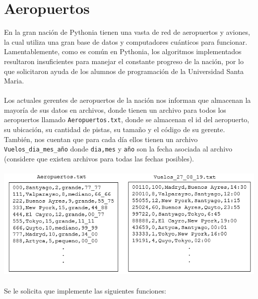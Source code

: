 \section{Aeropuertos}
En la gran nación de Pythonia tienen una vasta de red de aeropuertos y aviones, la cual utiliza una gran base de datos y computadores cuánticos para funcionar. Lamentablemente, como es común en Pythonia, los algoritmos implementados resultaron insuficientes para manejar el constante progreso de la nación, por lo que solicitaron ayuda de los alumnos de programación de la Universidad Santa Maria.\\\\
Los actuales gerentes de aeropuertos de la nación nos informan que almacenan la mayoría de sus datos en archivos, donde tienen un archivo para todos los aeropuertos llamado \texttt{Aeropuertos.txt}, donde se almacenan el id del aeropuerto, su ubicación, su cantidad de pistas, su tamaño y el código de su gerente. También, nos cuentan que para cada día ellos tienen un archivo \texttt{Vuelos\_dia\_mes\_año} donde \texttt{dia,mes} y \texttt{año} son la fecha asociada al archivo (considere que existen archivos para todas las fechas posibles).
\\
\\
\includegraphics[scale=0.9]{Imagenes/original.PNG}\\\\
Se le solicita que implemente las siguientes funciones:
